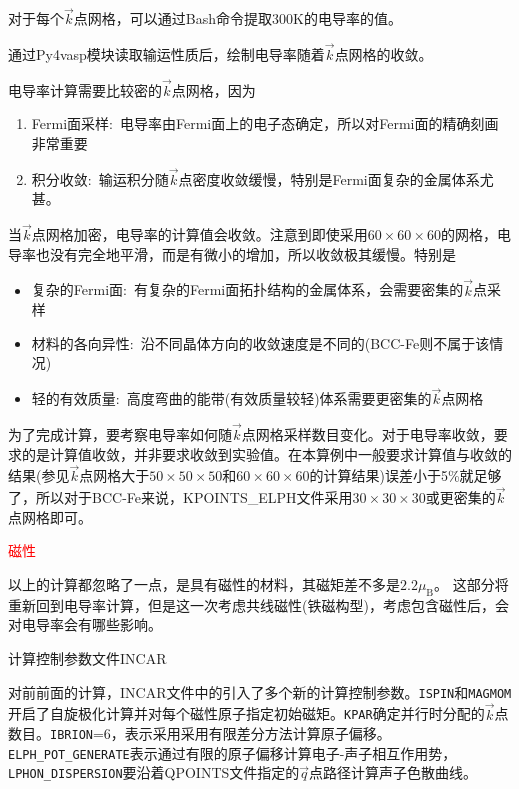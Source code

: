 {对于每个$\vec k$点网格，可以通过\textrm{Bash}命令提取\textrm{300K}的电导率的值。

通过\textrm{Py4vasp}模块读取输运性质后，绘制电导率随着$\vec k$点网格的收敛。

电导率计算需要比较密的$\vec k$点网格，因为
\begin{enumerate}
	\item \textrm{Fermi}面采样:~电导率由\textrm{Fermi}面上的电子态确定，所以对\textrm{Fermi}面的精确刻画非常重要
	\item 积分收敛:~输运积分随$\vec k$点密度收敛缓慢，特别是\textrm{Fermi}面复杂的金属体系尤甚。
\end{enumerate}
当$\vec k$点网格加密，电导率的计算值会收敛。注意到即使采用$60\times60\times60$的网格，电导率也没有完全地平滑，而是有微小的增加，所以收敛极其缓慢。特别是
\begin{itemize}
	\item 复杂的\textrm{Fermi}面:~有复杂的\textrm{Fermi}面拓扑结构的金属体系，会需要密集的$\vec k$点采样
	\item 材料的各向异性:~沿不同晶体方向的收敛速度是不同的(\textrm{BCC-Fe}则不属于该情况)
	\item 轻的有效质量:~高度弯曲的能带(有效质量较轻)体系需要更密集的$\vec k$点网格
\end{itemize}
为了完成计算，要考察电导率如何随$\vec k$点网格采样数目变化。对于电导率收敛，要求的是计算值收敛，并非要求收敛到实验值。在本算例中一般要求计算值与收敛的结果(参见$\vec k$点网格大于$50\times50\times50$和$60\times60\times60$的计算结果)误差小于5\%就足够了，所以对于\textrm{BCC-Fe}来说，\textrm{KPOINTS\_ELPH}文件采用$30\times30\times30$或更密集的$\vec k$点网格即可。

\textcolor{red}{磁性}

以上的计算都忽略了一点，是具有磁性的材料，其磁矩差不多是$2.2\mu_{\mathrm{B}}$。%
这部分将重新回到电导率计算，但是这一次考虑共线磁性(铁磁构型)，考虑包含磁性后，会对电导率会有哪些影响。

计算控制参数文件\textrm{INCAR}

对前前面的计算，\textrm{INCAR}文件中的引入了多个新的计算控制参数。\texttt{ISPIN}和\texttt{MAGMOM}开启了自旋极化计算并对每个磁性原子指定初始磁矩。\texttt{KPAR}确定并行时分配的$\vec k$点数目。\texttt{IBRION}=6，表示采用采用有限差分方法计算原子偏移。\texttt{ELPH\_POT\_GENERATE}表示通过有限的原子偏移计算电子-声子相互作用势，\texttt{LPHON\_DISPERSION}要沿着\textrm{QPOINTS}文件指定的$\vec q$点路径计算声子色散曲线。

}
